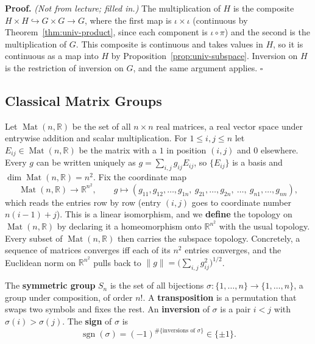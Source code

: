 \documentclass[11pt]{report}
\makeatletter
\newcounter{defcounter}[section]
\renewenvironment{proof}[1][Proof]{\noindent\textbf{#1.} }{\hfill$\square$\par\vspace{5pt}}
\newcommand{\deflabel}[1]{\edef\@currentlabel{\arabic{section}.\arabic{defcounter}}\label{#1}}
\DeclareMathOperator{\Mat}{Mat}
\DeclareMathOperator{\sgn}{sgn}
\newcommand{\leeref}[1]{\par\smallskip{\raggedleft\footnotesize\textsc{Lee}:\ #1\par}}
\makeatother
\begin{document}
\begin{proof}
\textit{(Not from lecture; filled in.)} The multiplication of $H$ is the composite $H \times H \hookrightarrow G \times G \to G$, where the first map is $\iota \times \iota$ (continuous by Theorem~\ref{thm:univ-product}, since each component is $\iota \circ \pi$) and the second is the multiplication of $G$. This composite is continuous and takes values in $H$, so it is continuous as a map into $H$ by Proposition~\ref{prop:univ-subspace}. Inversion on $H$ is the restriction of inversion on $G$, and the same argument applies.
\end{proof}

\subsection{Classical Matrix Groups}

\begin{defbox}\deflabel{def:mat-euclid}
Let $\Mat(n, \mathbb{R})$ be the set of all $n \times n$ real matrices, a real vector space under entrywise addition and scalar multiplication. For $1 \le i, j \le n$ let $E_{ij} \in \Mat(n,\mathbb{R})$ be the matrix with a $1$ in position $(i,j)$ and $0$ elsewhere. Every $g$ can be written uniquely as $g = \sum_{i,j} g_{ij} E_{ij}$, so $\{E_{ij}\}$ is a basis and $\dim \Mat(n,\mathbb{R}) = n^2$. Fix the coordinate map
\[
\Mat(n,\mathbb{R}) \longrightarrow \mathbb{R}^{n^2}, \qquad g \longmapsto (g_{11}, g_{12}, \ldots, g_{1n},\ g_{21}, \ldots, g_{2n},\ \ldots,\ g_{n1}, \ldots, g_{nn}),
\]
which reads the entries row by row (entry $(i,j)$ goes to coordinate number $n(i-1) + j$). This is a linear isomorphism, and we \textbf{define} the topology on $\Mat(n,\mathbb{R})$ by declaring it a homeomorphism onto $\mathbb{R}^{n^2}$ with the usual topology. Every subset of $\Mat(n,\mathbb{R})$ then carries the subspace topology. Concretely, a sequence of matrices converges iff each of its $n^2$ entries converges, and the Euclidean norm on $\mathbb{R}^{n^2}$ pulls back to $\|g\| = \big(\sum_{i,j} g_{ij}^2\big)^{1/2}$.
\leeref{Example 1.25}
\end{defbox}

\begin{defbox}\deflabel{def:sgn}
The \textbf{symmetric group} $S_n$ is the set of all bijections $\sigma : \{1, \ldots, n\} \to \{1, \ldots, n\}$, a group under composition, of order $n!$. A \textbf{transposition} is a permutation that swaps two symbols and fixes the rest. An \textbf{inversion} of $\sigma$ is a pair $i < j$ with $\sigma(i) > \sigma(j)$. The \textbf{sign} of $\sigma$ is
\[
\sgn(\sigma) = (-1)^{\#\{\text{inversions of } \sigma\}} \in \{\pm 1\}.
\]
\leeref{App.~B, \emph{The Determinant}}
\end{defbox}
\end{document}
